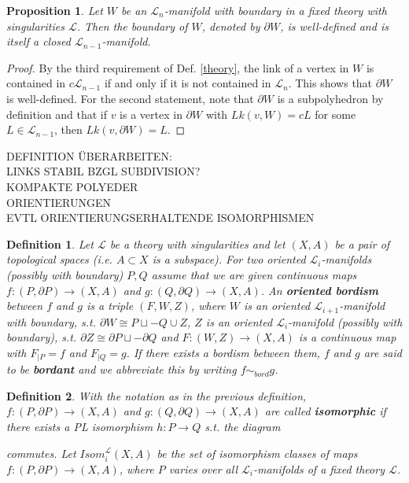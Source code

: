 \documentclass[11pt]{book}
\newtheorem{prop}{Proposition}
\newtheorem{definition}{Definition}
\begin{document}
\begin{prop}
Let $W$ be an $\mathcal{L}_n$-manifold with boundary in a fixed theory with singularities $\mathcal{L}$. Then the boundary of $W$, denoted by $\partial W$, is well-defined and is itself a closed $\mathcal{L}_{n-1}$-manifold.
\end{prop}

\begin{proof}
By the third requirement of Def. \ref{theory}, the link of a vertex in $W$ is contained in $c \mathcal{L}_{n-1}$ if and only if it is not contained in $\mathcal{L}_n$. This shows that $\partial W$ is well-defined. For the second statement, note that $\partial W$ is a subpolyhedron by definition and that if $v$ is a vertex in $\partial W$ with $Lk(v,W)=cL$ for some $L \in \mathcal{L}_{n-1}$, then $Lk(v,\partial W) = L$.
\end{proof}

DEFINITION ÜBERARBEITEN: \\
LINKS STABIL BZGL SUBDIVISION? \\
KOMPAKTE POLYEDER \\
ORIENTIERUNGEN \\
EVTL ORIENTIERUNGSERHALTENDE ISOMORPHISMEN 

\begin{definition}
Let $\mathcal{L}$ be a theory with singularities and let $(X,A)$ be a pair of topological spaces (i.e. $A \subset X$ is a subspace). For two oriented $\mathcal{L}_i$-manifolds (possibly with boundary) $P,Q$  assume that we are given continuous maps $f:(P, \partial P) \to (X,A)$ and $g:(Q , \partial Q) \to (X,A)$. An \textbf{oriented bordism} between $f$ and $g$ is a triple $(F,W,Z)$, where $W$ is an oriented $\mathcal{L}_{i+1}$-manifold with boundary, s.t. $\partial W \cong P \sqcup -Q \cup Z$, $Z$ is an oriented $\mathcal{L}_i$-manifold (possibly with boundary), s.t. $\partial Z\cong \partial P \sqcup - \partial Q$ and $F: (W,Z) \to (X,A)$ is a continuous map with $F _{|P} = f$ and $F_{|Q}=g$. If there exists a bordism between them, $f$ and $g$ are said to be \textbf{bordant} and we abbreviate this by writing $f \sim_{bord} g$.
\end{definition}

\begin{definition}
With the notation as in the previous definition, $f: (P, \partial P) \to (X,A)$ and $g: (Q, \partial Q) \to (X,A)$ are called \textbf{isomorphic} if there exists a PL isomorphism $h : P \to Q$ s.t. the diagram \newline
\begin{xy}
\end{xy}
\newline
commutes. Let $Isom_{i}^{\mathcal{L}}(X,A)$ be the set of isomorphism classes of maps $f: (P, \partial P) \to (X,A)$, where $P$ varies over all $\mathcal{L}_i$-manifolds of a fixed theory $\mathcal{L}$.
\end{definition}
\end{document}
